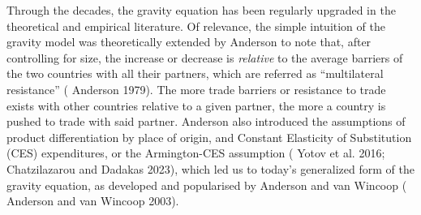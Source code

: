 \documentclass[12pt]{article}%
\begin{document}
Through the decades, the gravity equation has been regularly upgraded in
the theoretical and empirical literature. Of relevance, the simple
intuition of the gravity model was theoretically extended by Anderson to
note that, after controlling for size, the increase or decrease is
\emph{relative} to the average barriers of the two countries with all
their partners, which are referred as ``multilateral resistance''
(\cite{anderson_theoretical_1979} Anderson 1979). The more trade barriers or resistance to trade exists
with other countries relative to a given partner, the more a country is
pushed to trade with said partner. Anderson also introduced the
assumptions of product differentiation by place of origin, and Constant
Elasticity of Substitution (CES) expenditures, or the Armington-CES
assumption (\cite{yotov_advanced_2016} Yotov et al. 2016; \cite{chatzilazarou_trade_2023} Chatzilazarou and Dadakas 2023), which
led us to today's generalized form of the gravity equation, as developed
and popularised by Anderson and van Wincoop (\cite{anderson_gravity_2003} Anderson and van Wincoop
2003).
\end{document}
